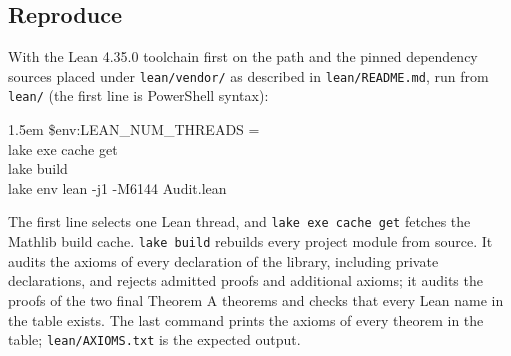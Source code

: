 \subsection{Reproduce}
With the Lean 4.35.0 toolchain first on the path and the pinned
dependency sources placed under \nolinkurl{lean/vendor/} as described in
\nolinkurl{lean/README.md}, run from \texttt{lean/} (the first line is
PowerShell syntax):
\begin{flushleft}\leftskip1.5em\ttfamily\frenchspacing
\$env:LEAN\_NUM\_THREADS = \textquotesingle\\
lake exe cache get\\
lake build\\
lake env lean -{}j1 -{}M6144 Audit.lean
\end{flushleft}
The first line selects one Lean thread, and \texttt{lake exe cache get}
fetches the Mathlib build cache. \texttt{lake build} rebuilds every project
module from source. It audits the axioms of every declaration of the
library, including private declarations, and rejects admitted proofs and
additional axioms; it audits the proofs of the two final Theorem A theorems and
checks that every Lean name in the table exists. The last command prints
the axioms of every theorem in the table; \nolinkurl{lean/AXIOMS.txt} is
the expected output.
